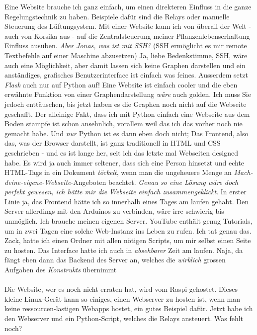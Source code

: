 \documentclass[12pt,titlepage,a4paper]{article}
\begin{document}
Eine Website brauche ich ganz einfach, um einen direkteren Einfluss in die ganze Regelungstechnik zu haben. Beispiele dafür sind die Relays oder manuelle Steuerung des Lüftungsystem. Mit einer Website kann ich von überall der Welt - auch von Korsika aus - auf die Zentralsteuerung meiner Pflanzenlebenserhaltung Einfluss ausüben. \textit{Aber Jonas, was ist mit SSH?} (SSH ermöglicht es mir remote Textbefehle auf einer Maschine abzusetzen) Ja, liebe Bedenkstimme, SSH, wäre auch eine Möglichkeit, aber damit lassen sich keine Graphen darstellen und ein anständiges, grafisches Benutzerinterface ist einfach was feines. Ausserdem setzt \textit{Flask} auch nur auf Python auf! Eine Website ist einfach cooler und die eben erwähnte Funktion von einer Graphendarstellung \textit{wäre} auch golden. Ich muss Sie jedoch enttäuschen, bis jetzt haben es die Graphen noch nicht auf die Webseite geschafft. Der alleinige Fakt, dass ich mit Python einfach eine Webseite aus dem Boden stampfe ist schon ansehnlich, vorallem weil das ich das vorher noch nie gemacht habe. Und \textit{nur} Python ist es dann eben doch nicht; Das Frontend, also das, was der Browser darstellt, ist ganz traditionell in HTML und CSS geschrieben - und es ist lange her, seit ich das letzte mal Webseiten designed habe. Es wird ja auch immer seltener, dass sich eine Person hinsetzt und echte HTML-Tags in ein Dokument \textit{töckelt}, wenn man die ungeheuere Menge an \textit{Mach-deine-eigene-Webseite}-Angeboten beachtet. \textit{Genau so eine Lösung wäre doch perfekt gewesen, ich hätte mir die Webseite einfach zusammengeklickt}. In erster Linie ja, das Frontend hätte ich so innerhalb eines Tages am laufen gehabt. Den Server allerdings mit den Arduinos zu verbinden, wäre irre schwierig bis unmöglich. Ich brauche meinen eigenen Server. YouTube enthält genug Tutorials, um in zwei Tagen eine solche Web-Instanz ins Leben zu rufen. Ich tat genau das. Zack, hatte ich einen Ordner mit allen nötigen Scripts, um mir selbst einen Seite zu hosten. Das Interface hatte ich auch in \textit{absehbarer} Zeit am laufen. Naja, da fängt eben dann das Backend des Server an, welches die \textit{wirklich} grossen Aufgaben des \textit{Konstrukts} übernimmt\\\\
Die Website, wer es noch nicht erraten hat, wird vom Raspi gehostet. Dieses kleine Linux-Gerät kann so einiges, einen Webserver zu hosten ist, wenn man keine ressourcen-lastigen Webapps hostet, ein gutes Beispiel dafür. Jetzt habe ich den Webserver und ein Python-Script, welches die Relays ansteuert. Was fehlt noch? \\
\end{document}
